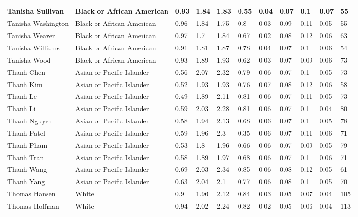 \begin{table}[!ht]
\begin{tabular}{|l|l|l|l|l|l|l|l|l|l|l|}
        Tanisha Sullivan & Black or African American & 0.93 & 1.84 & 1.83 & 0.55 & 0.04 & 0.07 & 0.1 & 0.07 & 55 \\ \hline
        Tanisha Washington & Black or African American & 0.96 & 1.84 & 1.75 & 0.8 & 0.03 & 0.09 & 0.11 & 0.05 & 55 \\ \hline
        Tanisha Weaver & Black or African American & 0.97 & 1.7 & 1.84 & 0.67 & 0.02 & 0.08 & 0.12 & 0.06 & 63 \\ \hline
        Tanisha Williams & Black or African American & 0.91 & 1.81 & 1.87 & 0.78 & 0.04 & 0.07 & 0.1 & 0.06 & 54 \\ \hline
        Tanisha Wood & Black or African American & 0.93 & 1.89 & 1.93 & 0.62 & 0.03 & 0.07 & 0.09 & 0.06 & 73 \\ \hline
        Thanh Chen & Asian or Pacific Islander & 0.56 & 2.07 & 2.32 & 0.79 & 0.06 & 0.07 & 0.1 & 0.05 & 73 \\ \hline
        Thanh Kim & Asian or Pacific Islander & 0.52 & 1.93 & 1.93 & 0.76 & 0.07 & 0.08 & 0.12 & 0.06 & 58 \\ \hline
        Thanh Le & Asian or Pacific Islander & 0.49 & 1.89 & 2.11 & 0.81 & 0.06 & 0.07 & 0.11 & 0.05 & 73 \\ \hline
        Thanh Li & Asian or Pacific Islander & 0.59 & 2.03 & 2.28 & 0.81 & 0.06 & 0.07 & 0.1 & 0.04 & 80 \\ \hline
        Thanh Nguyen & Asian or Pacific Islander & 0.58 & 1.94 & 2.13 & 0.68 & 0.06 & 0.07 & 0.1 & 0.05 & 78 \\ \hline
        Thanh Patel & Asian or Pacific Islander & 0.59 & 1.96 & 2.3 & 0.35 & 0.06 & 0.07 & 0.11 & 0.06 & 71 \\ \hline
        Thanh Pham & Asian or Pacific Islander & 0.53 & 1.8 & 1.96 & 0.66 & 0.06 & 0.07 & 0.09 & 0.05 & 79 \\ \hline
        Thanh Tran & Asian or Pacific Islander & 0.58 & 1.89 & 1.97 & 0.68 & 0.06 & 0.07 & 0.1 & 0.06 & 71 \\ \hline
        Thanh Wang & Asian or Pacific Islander & 0.69 & 2.03 & 2.34 & 0.85 & 0.06 & 0.08 & 0.12 & 0.05 & 61 \\ \hline
        Thanh Yang & Asian or Pacific Islander & 0.63 & 2.04 & 2.1 & 0.77 & 0.06 & 0.08 & 0.1 & 0.05 & 70 \\ \hline
        Thomas Hansen & White & 0.9 & 1.96 & 2.12 & 0.84 & 0.03 & 0.05 & 0.07 & 0.04 & 105 \\ \hline
        Thomas Hoffman & White & 0.94 & 2.02 & 2.24 & 0.82 & 0.02 & 0.05 & 0.06 & 0.04 & 113 \\ \hline

\end{tabular}
\end{table}
